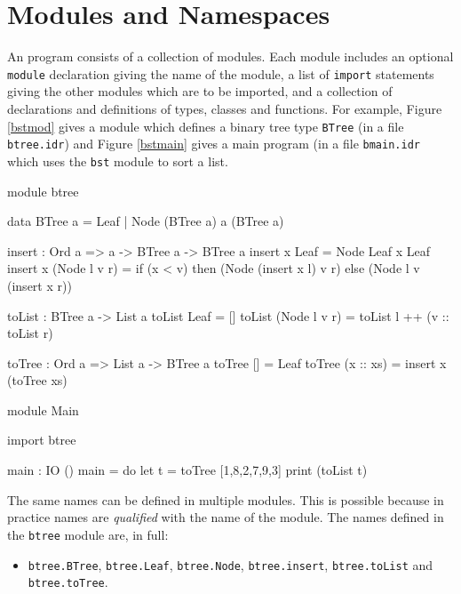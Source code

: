 \section{Modules and Namespaces}
\label{sect:namespaces}

An \Idris{} program consists of a collection of modules. Each module includes
an optional \texttt{module} declaration giving the name of the module, a
list of \texttt{import} statements giving the other modules which are to be imported,
and a collection of declarations and definitions of types, classes and functions.
For example, Figure \ref{bstmod} gives a module which defines a binary
tree type \texttt{BTree} (in a file \texttt{btree.idr}) and Figure
\ref{bstmain} gives a main program (in a file \texttt{bmain.idr} which uses the
\texttt{bst} module to sort a list.

\begin{code}[caption={Binary Tree module}, label=bstmod]
module btree

data BTree a = Leaf
             | Node (BTree a) a (BTree a)

insert : Ord a => a -> BTree a -> BTree a
insert x Leaf = Node Leaf x Leaf
insert x (Node l v r) = if (x < v) then (Node (insert x l) v r)
                                   else (Node l v (insert x r))

toList : BTree a -> List a
toList Leaf = []
toList (Node l v r) = toList l ++ (v :: toList r)

toTree : Ord a => List a -> BTree a
toTree [] = Leaf
toTree (x :: xs) = insert x (toTree xs)
\end{code}

\begin{code}[caption={Binary Tree main program},label=btmain]
module Main

import btree

main : IO ()
main = do let t = toTree [1,8,2,7,9,3] 
          print (toList t)
\end{code}

\noindent
The same names can be defined in multiple modules. This is possible because in practice names
are \emph{qualified} with the name of the module. 
The names defined in the \texttt{btree} module are, in full:

\begin{itemize}
\item \texttt{btree.BTree}, \texttt{btree.Leaf}, \texttt{btree.Node}, \texttt{btree.insert},
\texttt{btree.toList} and \texttt{btree.toTree}.
\end{itemize}

